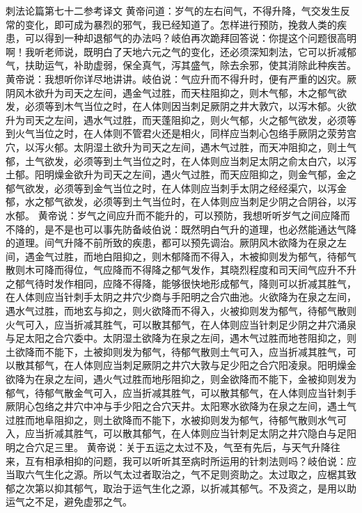 \documentclass[12pt,UTF8]{ctexbook}
\begin{document}
刺法论篇第七十二参考译文
黄帝问道：岁气的左右间气，不得升降，气交发生反常的变化，即可成为暴烈的邪气，我已经知道了。怎样进行预防，挽救人类的疾患，可以得到一种却退郁气的办法吗？岐伯再次跪拜回答说：你提这个问题很高明啊！我听老师说，既明白了天地六元之气的变化，还必须深知刺法，它可以折减郁气，扶助运气，补助虚弱，保全真气，泻其盛气，除去余邪，使其消除此种疾苦。黄帝说：我想听你详尽地讲讲。岐伯说：气应升而不得升时，便有严重的凶灾。厥阴风木欲升为司天之左间，遇金气过胜，而天柱阻抑之，则木气郁，木之郁气欲发，必须等到木气当位之时，在人体则因当刺足厥阴之井大敦穴，以泻木郁。火欲升为司天之左间，遇水气过胜，而天蓬阻抑之，则火气郁，火之郁气欲发，必须等到火气当位之时，在人体则不管君火还是相火，同样应当刺心包络手厥阴之荥劳宫穴，以泻火郁。太阴湿土欲升为司天之左间，遇木气过胜，而天冲阻抑之，则土气郁，土气欲发，必须等到土气当位之时，在人体则应当刺足太阴之俞太白穴，以泻土郁。阳明燥金欲升为司天之左间，遇火气过胜，而天应阻抑之，则金气郁，金之郁气欲发，必须等到金气当位之时，在人体则应当刺手太阴之经经渠穴，以泻金郁，水之郁气欲发，必须等到土气当位时，在人体则应当刺足少阴之合阴谷，以泻水郁。
黄帝说：岁气之间应升而不能升的，可以预防，我想听听岁气之间应降而不降的，是不是也可以事先防备岐伯说：既然明白气升的道理，也必然能通达气降的道理。间气升降不前所致的疾患，都可以预先调治。厥阴风木欲降为在泉之左间，遇金气过胜，而地白阻抑之，则木郁降而不得入，木被抑则发为郁气，待郁气散则木可降而得位，气应降而不得降之郁气发作，其晓烈程度和司天间气应升不升之郁气待时发作相同，应降不得降，能够很快地形成郁气，降则可以折减其胜气，在人体则应当针刺手太阴之井穴少商与手阳明之合穴曲池。火欲降为在泉之左间，遇水气过胜，而地玄与抑之，则火欲降而不得入，火被抑则发为郁气，待郁气散则火气可入，应当折减其胜气，可以散其郁气，在人体则应当针刺足少阴之井穴涌泉与足太阳之合穴委中。太阴湿土欲降为在泉之左间，遇木气过胜而地苍阻抑之，则土欲降而不能下，土被抑则发为郁气，待郁气散则土气可入，应当折减其胜气，可以散其郁气，在人体则应当刺足厥阴之井穴大敦与足少阳之合穴阳凌泉。阳明燥金欲降为在泉之左间，遇火气过胜而地彤阻抑之，则金欲降而不能下，金被抑则发为郁气，待郁气散金气可入，应当折减其胜气，可以散其郁气，在人体则应当针刺手厥阴心包络之井穴中冲与手少阳之合穴天井。太阳寒水欲降为在泉之左间，遇土气过胜而地阜阻抑之，则土欲降而不能下，水被抑则发为郁气，待郁气散则水气可入，应当折减其胜气，可以散其郁气，在人体则应当针刺足太阴之井穴隐白与足阳明之合穴足三里。
黄帝说：关于五运之太过不及，气至有先后，与天气升降往来，互有相承相抑的问题，我可以听听其至病时所运用的针刺法则吗？岐伯说：应当取六气生化之源。所以气太过者取治之，气不足则资助之。太过取之，应椐其致郁之次第以抑其郁气，取治于运气生化之源，以折减其郁气。不及资之，是用以助运气之不足，避免虚邪之气。
\end{document}

